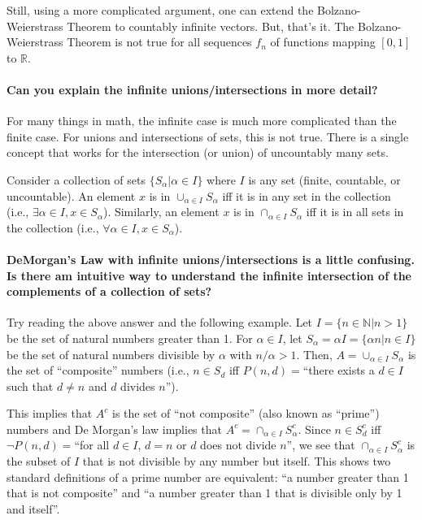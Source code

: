 \documentclass[10pt,english]{article}
\begin{document}
Still, using a more complicated argument, one can extend the Bolzano-Weierstrass Theorem to countably infinite vectors.
But, that's it.
The Bolzano-Weierstrass Theorem is not true for all sequences $f_n$ of functions mapping $[0,1]$ to $\mathbb{R}$. 

\paragraph{Can you explain the infinite unions/intersections in more detail?}

For many things in math, the infinite case is much more complicated than the finite case.
For unions and intersections of sets, this is not true.
There is a single concept that works for the intersection (or union) of uncountably many sets.

Consider a collection of sets $\{ S_\alpha | \alpha\in I\}$ where $I$ is any set (finite, countable, or uncountable).
An element $x$ is in $\cup_{\alpha \in I} S_\alpha$ iff it is in any set in the collection (i.e., $\exists \alpha \in I, x\in S_\alpha$).
Similarly, an element $x$ is in $\cap_{\alpha \in I} S_\alpha$ iff it is in all sets in the collection (i.e., $\forall \alpha \in I, x\in S_\alpha$).


\paragraph{DeMorgan's Law with infinite unions/intersections is a little confusing. Is there am intuitive way to understand the infinite intersection of the complements of a collection of sets?}

Try reading the above answer and the following example.
Let $I = \{n\in \mathbb{N}| n > 1\}$ be the set of natural numbers greater than 1.
For $\alpha \in I$, let $S_\alpha = \alpha I = \{ \alpha n | n \in I \}$ be the set of natural numbers divisible by $\alpha$ with $n/\alpha > 1$.
Then, $A = \cup_{\alpha \in I} S_\alpha$ is the set of ``composite'' numbers (i.e., $n\in S_d$ iff $P(n,d)=$``there exists a $d\in I$ such that $d \neq n$ and $d$ divides $n$'').

This implies that $A^c$ is the set of ``not composite'' (also known as ``prime'') numbers and De Morgan's law implies that $A^c = \cap_{\alpha \in I} S_{\alpha}^c$.
Since $n \in S_d^c$ iff $\neg P(n,d)=$``for all $d \in I$, $d=n$ or $d$ does not divide $n$'', we see that $\cap_{\alpha \in I} S_{\alpha}^c$ is the subset of $I$ that is not divisible by any number but itself.
This shows two standard definitions of a prime number are equivalent: ``a number greater than 1 that is not composite'' and ``a number greater than 1 that is divisible only by 1 and itself''.
\end{document}
